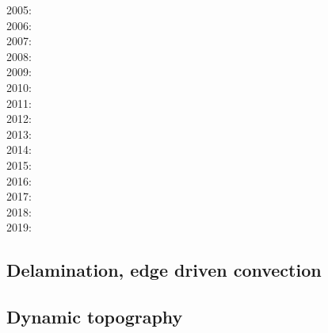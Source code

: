 {2005: \cite{hagu05}\cite{wiwg05}\cite{mcjp05}\\
2006: \cite{libi06}\cite{bube06}\cite{basv06}\cite{kasc06}\cite{fuwb06}\cite{colm06}\cite{pabs06}\\
2007: \cite{afrf07}\cite{kore07}\cite{gewm07}\cite{jabn07}\\
2008: \cite{affr08}\cite{tibb08}\cite{hapo08}\cite{busc08}\cite{clbz08}\cite{chlg08}
      \cite{kasb08}\cite{fabs08}\cite{chgu08}\cite{buit08}\\
2009: \cite{bupb09}\cite{plmg09}\cite{rigo09}\cite{bubg09}\cite{coco09}\\
2010: \cite{hamo10}\cite{fasm10}\cite{grpy10}\cite{vago10}\cite{plmf10}\cite{spgs10a}\cite{pygp10}
      \cite{jabw10}\\
2011: \cite{rera11}\cite{chss11}\\
2012: \cite{wagw12}\cite{vacl12}\cite{buit12}\cite{kogp12}\cite{gohg12}\cite{trub12}\\
2013: \cite{wazh13}\cite{krcu13}\cite{frbm13}\cite{wagw13}\cite{duyp13}\cite{rugb13}
      \cite{scdg13}\\
2014: \cite{kava14}\cite{dusp14}\cite{wavp14}\cite{whbb14}\cite{scml14}
      \cite{mals14}\cite{gupm14}\cite{gahs14}\cite{mutg14}\\
2015: \cite{wavp15}\cite{thkp15}\cite{mags15}\cite{duys15}\\
2016: \cite{wahz16}\\
2017: \cite{rugb17}\cite{ozgw17}\cite{vomc17}\cite{taac17}\\
2018: \cite{wavp18}\cite{nigw18}\cite{bemc18}\\
2019: \cite{koen19}\cite{kipd19}\cite{crcm19}\cite{pedm19}
}

\subsection{Delamination, edge driven convection} 

{\scriptsize
\noindent
\cite{kian95}
\cite{kian98}\cite{scsc98}
\cite{kiri00}\cite{scys00}
\cite{modo04}
\cite{elki07}
\cite{gopy08}
\cite{vabv10}
\cite{vavg12}
\cite{krcu13}\cite{sths13}
\cite{baeg14}
\cite{bems17}
}

\subsection{Dynamic topography} 

